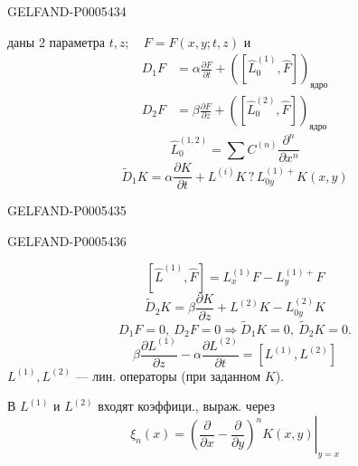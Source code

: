 \begin{GelfandAdjacentEvidence}{GELFAND-P000543}{4}

даны 2 параметра \(t,z;\quad F=F(x,y;t,z)\) и
\begin{align}
D_1F&=\alpha\frac{\partial F}{\partial t}
+([\hat L_0^{(1)},\hat F])_{\text{ядро}}\tag{10}\\
D_2F&=\beta\frac{\partial F}{\partial z}
+([\hat L_0^{(2)},\hat F])_{\text{ядро}}\tag{11}
\end{align}
\[
\hat L_0^{(1,2)}=\sum C^{(n)}\frac{\partial^n}{\partial x^n}
\]
\[
\tilde D_1K=\alpha\frac{\partial K}{\partial t}
+L^{(i)}K\mathbin{?}L_{0y}^{(1)+}K(x,y)\tag{12}
\]
\end{GelfandAdjacentEvidence}
\begin{GelfandAdjacentEvidence}{GELFAND-P000543}{5}

\end{GelfandAdjacentEvidence}
\begin{GelfandAdjacentEvidence}{GELFAND-P000543}{6}

\end{GelfandAdjacentEvidence}

\[
[\hat L^{(1)},\hat F]=L_x^{(1)}F-L_y^{(1)+}F
\]
\[
\tilde D_2K=\beta\frac{\partial K}{\partial z}
+L^{(2)}K-L_{0y}^{(2)}K\tag{13}
\]
\[
\boxed{D_1F=0,\ D_2F=0\Longrightarrow\tilde D_1K=0,\ \tilde D_2K=0.}\tag{14}
\]
\[
\boxed{\beta\frac{\partial L^{(1)}}{\partial z}
-\alpha\frac{\partial L^{(2)}}{\partial t}
=[L^{(1)},L^{(2)}]}\tag{15}
\]
\(L^{(1)},L^{(2)}\) — лин. операторы (при заданном \(K\)).

В \(L^{(1)}\) и \(L^{(2)}\) входят коэффици., выраж. через
\[
\xi_n(x)=\left.\left(\frac{\partial}{\partial x}
-\frac{\partial}{\partial y}\right)^n K(x,y)\right|_{y=x}
\]


